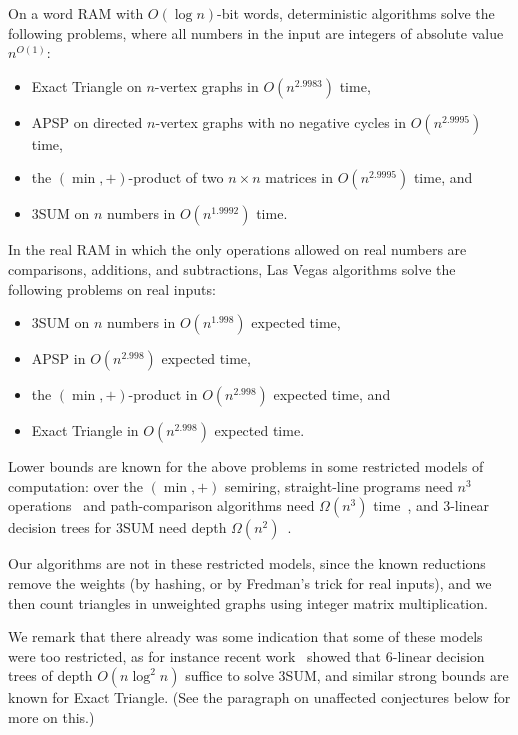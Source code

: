 \begin{theorem}\label{thm:intro2}
On a word RAM with $O(\log n)$-bit words, deterministic algorithms solve the following problems, where all numbers in the input are integers of absolute value $n^{O(1)}$:
\begin{itemize}
\item Exact Triangle on $n$-vertex graphs in $O(n^{2.9983})$ time,
\item APSP on directed $n$-vertex graphs with no negative cycles in $O(n^{2.9995})$ time,
\item the $(\min,+)$-product of two $n\times n$ matrices in $O(n^{2.9995})$ time, and
\item $3$SUM on $n$ numbers in $O(n^{1.9992})$ time.
\end{itemize}
In the real RAM in which the only operations allowed on real numbers are comparisons, additions, and subtractions, Las Vegas algorithms solve the following problems on real inputs:
\begin{itemize}
\item $3$SUM on $n$ numbers in $O(n^{1.998})$ expected time,
\item APSP in $O(n^{2.998})$ expected time,
\item the $(\min,+)$-product in $O(n^{2.998})$ expected time, and
\item Exact Triangle in $O(n^{2.998})$ expected time.
\end{itemize}
\end{theorem}



Lower bounds are known for the above problems in some restricted models of computation: over the $(\min,+)$ semiring, straight-line programs need $n^3$ operations~\cite{Ker70} and path-comparison algorithms need $\Omega(n^3)$ time~\cite{KKP93}, and 3-linear decision trees for $3$SUM need depth $\Omega(n^2)$~\cite{Eri99,AC05}.

Our algorithms are not in these restricted models, since the known reductions remove the weights (by hashing, or by Fredman's trick for real inputs), and we then count triangles in unweighted graphs using integer matrix multiplication. 

We remark that there already was some indication that some of these models were too restricted, as for instance recent work~\cite{KLM19} showed that $6$-linear decision trees of depth $O(n\log^2 n)$ suffice to solve $3$SUM, and similar strong bounds are known for Exact Triangle. (See the paragraph on unaffected conjectures below for more on this.)

